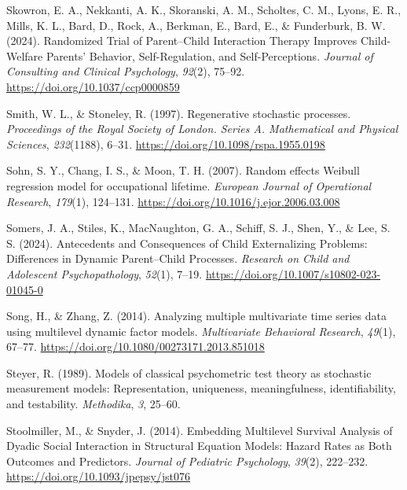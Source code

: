 \documentclass[12pt]{./styles/outhesis}
\begin{document}
\leavevmode{}%
Skowron, E. A., Nekkanti, A. K., Skoranski, A. M., Scholtes, C. M.,
Lyons, E. R., Mills, K. L., Bard, D., Rock, A., Berkman, E., Bard, E.,
\& Funderburk, B. W. (2024). Randomized {Trial} of {Parent}--{Child
Interaction Therapy Improves Child-Welfare Parents}' {Behavior},
{Self-Regulation}, and {Self-Perceptions}. \emph{Journal of Consulting
and Clinical Psychology}, \emph{92}(2), 75--92.
\url{https://doi.org/10.1037/ccp0000859}

\leavevmode{}%
Smith, W. L., \& Stoneley, R. (1997). Regenerative stochastic processes.
\emph{Proceedings of the Royal Society of London. Series A. Mathematical
and Physical Sciences}, \emph{232}(1188), 6--31.
\url{https://doi.org/10.1098/rspa.1955.0198}

\leavevmode{}%
Sohn, S. Y., Chang, I. S., \& Moon, T. H. (2007). Random effects
{Weibull} regression model for occupational lifetime. \emph{European
Journal of Operational Research}, \emph{179}(1), 124--131.
\url{https://doi.org/10.1016/j.ejor.2006.03.008}

\leavevmode{}%
Somers, J. A., Stiles, K., MacNaughton, G. A., Schiff, S. J., Shen, Y.,
\& Lee, S. S. (2024). Antecedents and {Consequences} of {Child
Externalizing Problems}: {Differences} in {Dynamic Parent}--{Child
Processes}. \emph{Research on Child and Adolescent Psychopathology},
\emph{52}(1), 7--19. \url{https://doi.org/10.1007/s10802-023-01045-0}

\leavevmode{}%
Song, H., \& Zhang, Z. (2014). Analyzing multiple multivariate time
series data using multilevel dynamic factor models. \emph{Multivariate
Behavioral Research}, \emph{49}(1), 67--77.
\url{https://doi.org/10.1080/00273171.2013.851018}

\leavevmode{}%
Steyer, R. (1989). Models of classical psychometric test theory as
stochastic measurement models: {Representation}, uniqueness,
meaningfulness, identifiability, and testability. \emph{Methodika},
\emph{3}, 25--60.

\leavevmode{}%
Stoolmiller, M., \& Snyder, J. (2014). Embedding {Multilevel Survival
Analysis} of {Dyadic Social Interaction} in {Structural Equation
Models}: {Hazard Rates} as {Both Outcomes} and {Predictors}.
\emph{Journal of Pediatric Psychology}, \emph{39}(2), 222--232.
\url{https://doi.org/10.1093/jpepsy/jst076}
\end{document}
